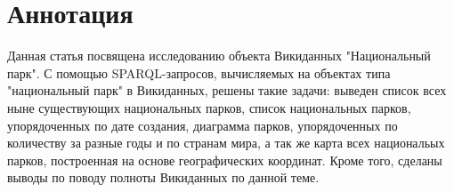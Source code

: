 \section{Аннотация}

Данная статья посвящена исследованию объекта Викиданных "Национальный парк". С помощью SPARQL-запросов, вычисляемых на объектах типа "национальный парк" в Викиданных, решены такие задачи: выведен список всех ныне существующих национальных парков, список национальных парков, упорядоченных по дате создания, диаграмма парков, упорядоченных по количеству за разные годы и по странам мира, а так же карта всех национальых парков, построенная на основе географических координат. Кроме того, сделаны выводы по поводу полноты Викиданных по данной теме.